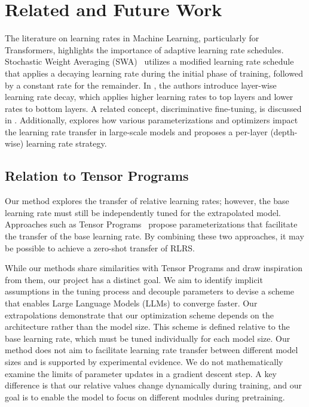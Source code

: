 \documentclass{article} %
\begin{document}
    \section{Related and Future Work}

    The literature on learning rates in Machine Learning, particularly for Transformers, highlights the importance of adaptive learning rate schedules. Stochastic Weight Averaging (SWA)~\citep{izmailov2018averaging} utilizes a modified learning rate schedule that applies a decaying learning rate during the initial phase of training, followed by a constant rate for the remainder. 
    In \citet{sun2019fine}, the authors introduce layer-wise learning rate decay, which applies higher learning rates to top layers and lower rates to bottom layers. A related concept, discriminative fine-tuning, is discussed in \citet{howard2018universal}. Additionally, \citet{everett2024scaling} explores how various parameterizations and optimizers impact the learning rate transfer in large-scale models and proposes a per-layer (depth-wise) learning rate strategy.

    \subsection{Relation to Tensor Programs}
    \label{future:tensor_programs}

    Our method explores the transfer of relative learning rates; however, the base learning rate must still be independently tuned for the extrapolated model. Approaches such as Tensor Programs~\citep{yang2020tensor, yang2022tensor, everett2024scaling} propose parameterizations that facilitate the transfer of the base learning rate. By combining these two approaches, it may be possible to achieve a zero-shot transfer of RLRS. 

    While our methods share similarities with Tensor Programs and draw inspiration from them, our project has a distinct goal. We aim to identify implicit assumptions in the tuning process and decouple parameters to devise a scheme that enables Large Language Models (LLMs) to converge faster. Our extrapolations demonstrate that our optimization scheme depends on the architecture rather than the model size. This scheme is defined relative to the base learning rate, which must be tuned individually for each model size. Our method does not aim to facilitate learning rate transfer between different model sizes and is supported by experimental evidence. We do not mathematically examine the limits of parameter updates in a gradient descent step. A key difference is that our relative values change dynamically during training, and our goal is to enable the model to focus on different modules during pretraining.
\end{document}
